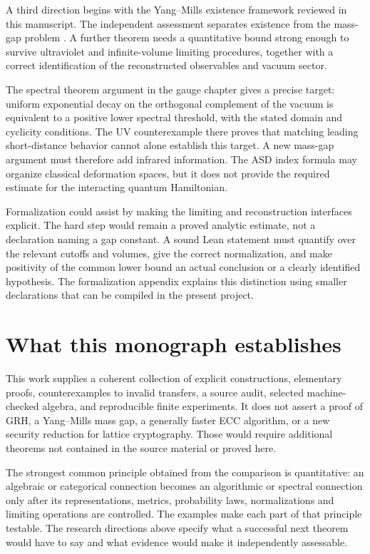 A third direction begins with the Yang--Mills existence framework reviewed in
this manuscript. The independent assessment separates existence from the
mass-gap problem \citep{YMReview2026}. A further theorem needs a quantitative
bound strong enough to survive ultraviolet and infinite-volume limiting
procedures, together with a correct identification of the reconstructed
observables and vacuum sector.

The spectral theorem argument in the gauge chapter gives a precise target:
uniform exponential decay on the orthogonal complement of the vacuum is
equivalent to a positive lower spectral threshold, with the stated domain
and cyclicity conditions. The UV counterexample there proves that matching
leading short-distance behavior cannot alone establish this target. A new
mass-gap argument must therefore add infrared information. The ASD index
formula may organize classical deformation spaces, but it does not provide
the required estimate for the interacting quantum Hamiltonian.

Formalization could assist by making the limiting and reconstruction
interfaces explicit. The hard step would remain a proved analytic estimate,
not a declaration naming a gap constant. A sound Lean statement must quantify
over the relevant cutoffs and volumes, give the correct normalization, and
make positivity of the common lower bound an actual conclusion or a clearly
identified hypothesis. The formalization appendix explains this distinction
using smaller declarations that can be compiled in the present project.

\section{What this monograph establishes}

This work supplies a coherent collection of explicit constructions,
elementary proofs, counterexamples to invalid transfers, a source audit,
selected machine-checked algebra, and reproducible finite experiments. It
does not assert a proof of GRH, a Yang--Mills mass gap, a generally faster ECC
algorithm, or a new security reduction for lattice cryptography. Those would
require additional theorems not contained in the source material or proved
here.

The strongest common principle obtained from the comparison is quantitative:
an algebraic or categorical connection becomes an algorithmic or spectral
connection only after its representations, metrics, probability laws,
normalizations and limiting operations are controlled. The examples make
each part of that principle testable. The research directions above specify
what a successful next theorem would have to say and what evidence would
make it independently assessable.
